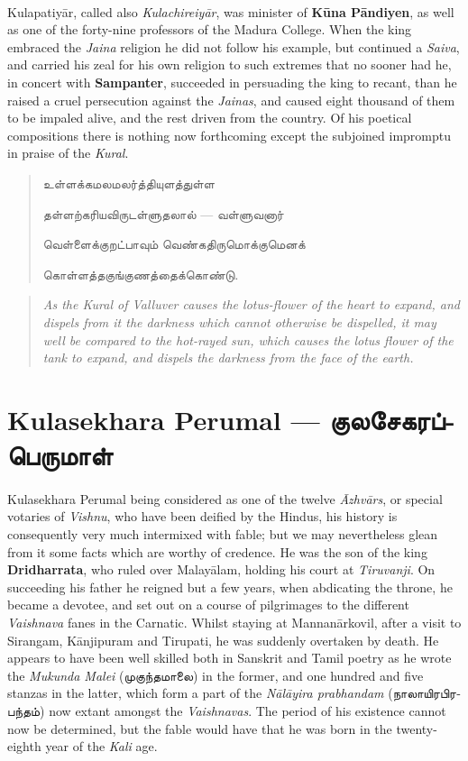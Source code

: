 \documentclass{article}
\newcommand{\TamilText}[1]{\texttamil{#1}}
\newcommand{\TamilBold}[1]{\texttamil{\textbf{#1}}}
\newcommand{\tam}[1]{\TamilText{#1}}
\newcommand{\tambold}[1]{\TamilBold{#1}}
\begin{document}
\paragraph{}
Kulapatiy\={a}r, called also \emph{Kulachireiy\={a}r}, was minister of \textbf{K\={u}na P\={a}ndiyen}, as well as one of the forty-nine professors of the Madura College. When the king embraced the \emph{Jaina} religion he did not follow his example, but continued a \emph{Saiva}, and carried his zeal for his own religion to such extremes that no sooner had he, in concert with \textbf{Sampanter}, succeeded in persuading the king to recant, than he raised a cruel persecution against the \emph{Jainas}, and caused eight thousand of them to be impaled alive, and the rest driven from the country. Of his poetical compositions there is nothing now forthcoming except the subjoined impromptu in praise of the \emph{Kural}.
\begin{quotation}\small
\tam{உள்ளக்கமலமலர்த்தியுளத்துள்ள}

\tam{தள்ளற்கரியவிருடள்ளுதலால்‌} --- \tam{வள்ளுவனார்}

\tam{வெள்ளைக்குறட்பாவும்‌ வெண்கதிருமொக்குமெனக்}

\tam{கொள்ளத்தகுங்குணத்தைக்கொண்டு}.
\end{quotation}
\begin{quotation}\small
\emph{As the Kural of Valluver causes the lotus-flower of the heart to expand, and dispels from it the darkness which cannot otherwise be dispelled, it may well be compared to the hot-rayed sun, which causes the lotus flower of the tank to expand, and dispels the darkness from the face of the earth.}
\end{quotation}
\section{Kulasekhara Perumal --- \tambold{குலசேகரப்பெருமாள்}}
\paragraph{}
Kulasekhara Perumal being considered as one of the twelve \emph{\={A}zhv\={a}rs}, or special votaries of \emph{Vishnu}, who have been deified by the Hindus, his history is consequently very much intermixed with fable; but we may nevertheless glean from it some facts which are worthy of credence. He was the son of the king \textbf{Dridharrata}, who ruled over Malay\={a}lam, holding his court at \emph{Tiruvanji}. On succeeding his father he reigned but a few years, when abdicating the throne, he became a devotee, and set out on a course of pilgrimages to the different \emph{Vaishnava} fanes in the Carnatic. Whilst staying at Mannan\={a}rkovil, after a visit to Sirangam, K\={a}njipuram and Tirupati, he was suddenly overtaken by death. He appears to have been well skilled both in Sanskrit and Tamil poetry as he wrote the \emph{Mukunda Malei} (\tam{முகுந்தமாலை}) in the former, and one hundred and five stanzas in the latter, which form a part of the \emph{N\={a}l\={a}yira prabhandam} (\tam{நாலாயிரபிரபந்தம்}) now extant amongst the \emph{Vaishnavas}. The period of his existence cannot now be determined, but the fable would have that he was born in the twenty-eighth year of the \emph{Kali} age.
\end{document}
